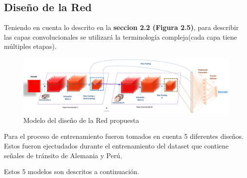 	\subsection{Diseño de la Red}
	
	Teniendo en cuenta lo descrito en la {\bf seccion 2.2 (Figura 2.5)}, para describir las capas convolucionales se utilizará la terminología compleja(cada capa tiene múltiples etapas).
	
		\begin{figure}[H]
		\includegraphics[width=1\textwidth]{images/desarrollo/networkArquitec/designNet}
		\begin{center}
		\caption{\small{Modelo del diseño de la Red propuesta}}
		
		{\small{\fontsize{10}{16.8}\selectfont {Fuente: Elaboración propia}}}
		\end{center}
		\vspace{-1.5em}
		\end{figure}


	Para el proceso de entrenamiento fueron tomados en cuenta 5 diferentes diseños. Estos fueron ejectudados durante el entrenamiento del dataset que contiene señales de tránsito de Alemania y Perú.

	Estos 5 modelos son descritos a continuación.
		\vspace{-1.5em}
